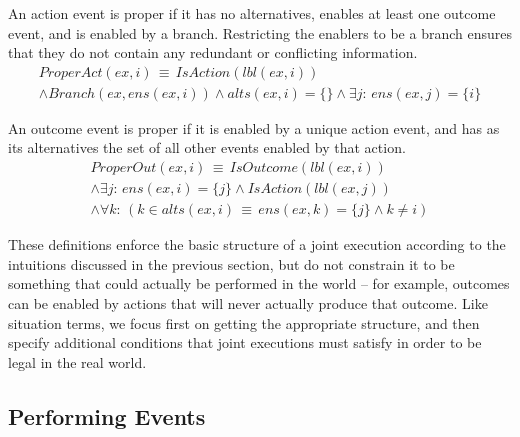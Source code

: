 An action event is proper if it has no alternatives, enables at least
one outcome event, and is enabled by a branch. Restricting the enablers
to be a branch ensures that they do not contain any redundant or conflicting
information.\begin{gather*}
ProperAct(ex,i)\,\equiv\, IsAction(lbl(ex,i))\\
\wedge Branch(ex,ens(ex,i))\wedge alts(ex,i)=\{\}\wedge\exists j:\, ens(ex,j)=\{i\}\end{gather*}


An outcome event is proper if it is enabled by a unique action event,
and has as its alternatives the set of all other events enabled by
that action.\begin{gather*}
ProperOut(ex,i)\,\equiv\, IsOutcome(lbl(ex,i))\\
\wedge\exists j:\, ens(ex,i)=\{j\}\wedge IsAction(lbl(ex,j))\\
\wedge\forall k:\,\left(k\in alts(ex,i)\,\equiv\, ens(ex,k)=\{j\}\wedge k\neq i\right)\end{gather*}


These definitions enforce the basic structure of a joint execution
according to the intuitions discussed in the previous section, but
do not constrain it to be something that could actually be performed
in the world -- for example, outcomes can be enabled by actions that
will never actually produce that outcome. Like situation terms, we
focus first on getting the appropriate structure, and then specify
additional conditions that joint executions must satisfy in order
to be legal in the real world.


\subsection{Performing Events}

